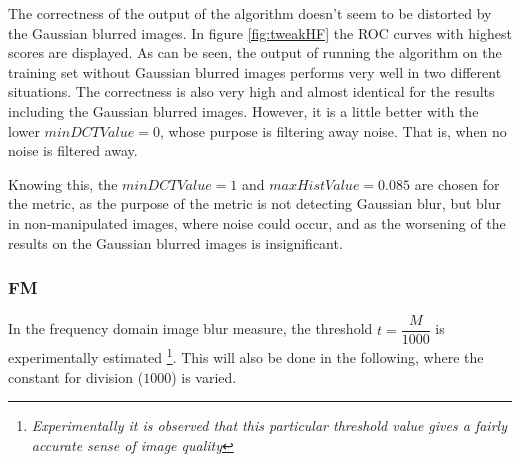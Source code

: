 The correctness of the output of the algorithm doesn't seem to be distorted by the Gaussian blurred images. In figure \ref{fig:tweakHF} the ROC curves with highest scores are displayed. As can be seen, the output of running the algorithm on the training set without Gaussian blurred images performs very well in two different situations. The correctness is also very high and almost identical for the results including the Gaussian blurred images. However, it is a little better with the lower $minDCTValue=0$, whose purpose is filtering away noise. That is, when no noise is filtered away.

Knowing this, the $minDCTValue=1$ and $maxHistValue=0.085$ are chosen for the metric, as the purpose of the metric is not detecting Gaussian blur, but blur in non-manipulated images, where noise could occur, and as the worsening of the results on the Gaussian blurred images is insignificant.


\subsubsection{FM}
In the frequency domain image blur measure, the threshold $t=\dfrac{M}{1000}$ is experimentally estimated \footnote{\textit{Experimentally it is observed that this particular threshold value gives a fairly accurate sense of image quality}\cite{FM}}. This will also be done in the following, where the constant for division ($1000$) is varied.

